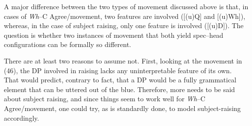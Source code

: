 \documentclass[output=paper
,modfonts
,nonflat]{langsci/langscibook}
\begin{document}
\begin{figure}[!h]
	\begin{exe}
	\end{exe}
\end{figure}
\newpage \noindent A major difference between the two types of movement discussed above is that, in cases of \textit{Wh}–C Agree/movement, two features are involved ([(u)Q] and [(u)Wh]), whereas, in the case of subject raising, only one feature is involved ([(u)D]). The question is whether two instances of movement that both yield spec–head configurations can be formally so different. 

There are at least two reasons to assume not. First, looking at the movement in (46), the DP involved in raising lacks any uninterpretable feature of its own. That would predict, contrary to fact, that a DP would be a fully grammatical element that can be uttered out of the blue. Therefore, more needs to be said about subject raising, and since things seem to work well for \textit{Wh}–C Agree/movement, one could try, as is standardly done, to model subject-raising accordingly.
\end{document}
